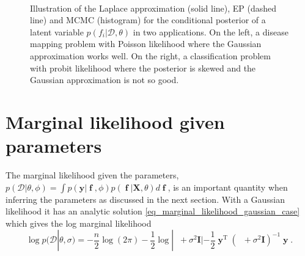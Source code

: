 \documentclass[twoside,11pt]{article}
\DeclareMathOperator{\Kff}{\mathbf{K}_{f,f}}
\DeclareMathOperator{\f}{\mathbf{f}}
\DeclareMathOperator{\y}{\mathbf{y}}
\newcommand{\mb}{\mathbf}
\begin{document}
\begin{figure}
  \begin{center}
    ~
  \end{center}\caption{Illustration of the Laplace approximation
    (solid line), EP (dashed line) and MCMC (histogram) for the
    conditional posterior of a latent variable
    $p(f_i|\mathcal{D},\theta)$ in two applications. On the left, a
    disease mapping problem with Poisson likelihood \citep[used
    in][]{Vanhatalo+Pietilainen+Vehtari:2010} where the Gaussian
    approximation works well. On the right, a classification problem
    with probit likelihood \citep[used in][]{Vanhatalo+Vehtari:2010}
    where the posterior is skewed and the Gaussian approximation is
    not so good.}
  \label{latent_intergation} 
\end{figure}

\section{Marginal likelihood given parameters}\label{sec_marginal_likelihood}

The marginal likelihood given the parameters,
$p(\mathcal{D}|\theta,\phi) = \int
p(\mb{y}|\f,\phi)p(\f|\mb{X},\theta) d\f$, is an important quantity
when inferring the parameters as discussed in the next section. With a
Gaussian likelihood it has an analytic solution
\eqref{eq_marginal_likelihood_gaussian_case} which gives the log
marginal likelihood
%
\begin{equation}\label{eq_log_marginal_likelihood}
\log p(\mathcal{D}|\theta,\sigma) =  -\frac{n}{2}\log(2\pi) -\frac{1}{2}
\log |\Kff + \sigma^2\mb{I}| -\frac{1}{2} \y^{\text{T}} (\Kff +
\sigma^2\mb{I})^{-1} \y. 
\end{equation}
\end{document}
